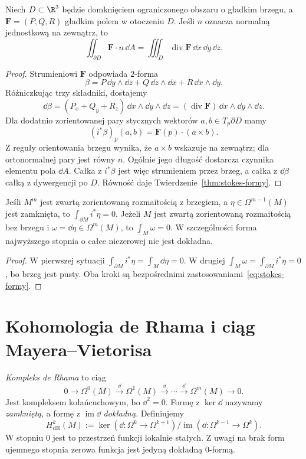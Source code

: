 \begin{wniosek}
\label{cor:stokes-gauss}
Niech $D\subset\R^3$ będzie domknięciem ograniczonego
obszaru o gładkim brzegu, a $\mathbf F=(P,Q,R)$
gładkim polem w otoczeniu $D$.
Jeśli $n$ oznacza normalną jednostkową
na zewnątrz, to
\[
 \iint_{\partial D}\mathbf F\cdot n\,\dd A
 =\iiint_D\operatorname{div}\mathbf F\,
                  \dd x\,\dd y\,\dd z.
\]
\end{wniosek}
\begin{proof}
Strumieniowi $\mathbf F$ odpowiada $2$-forma
\[
 \beta=P\,\dd y\wedge\dd z
      +Q\,\dd z\wedge\dd x
      +R\,\dd x\wedge\dd y.
\]
Różniczkując trzy składniki, dostajemy
\[
 \dd\beta=(P_x+Q_y+R_z)\,
           \dd x\wedge\dd y\wedge\dd z
          =(\operatorname{div}\mathbf F)\,
           \dd x\wedge\dd y\wedge\dd z.
\]
Dla dodatnio zorientowanej pary stycznych
wektorów $a,b\in T_p\partial D$ mamy
\[
 (i^*\beta)_p(a,b)
 =\mathbf F(p)\cdot(a\times b).
\]
Z reguły orientowania brzegu wynika, że
$a\times b$ wskazuje na zewnątrz; dla
ortonormalnej pary jest równy $n$.
Ogólnie jego długość dostarcza czynnika
elementu pola $\dd A$. Całka z $i^*\beta$
jest więc strumieniem przez brzeg, a całka
z $\dd\beta$ całką z dywergencji po $D$.
Równość daje Twierdzenie~\ref{thm:stokes-formy}.
\end{proof}

\begin{wniosek}
\label{cor:stokes-top-form}
Jeśli $M^m$ jest zwartą zorientowaną rozmaitością
z brzegiem, a $\eta\in\Omega^{m-1}(M)$ jest
zamknięta, to $\int_{\partial M}i^*\eta=0$.
Jeżeli $M$ jest zwartą zorientowaną rozmaitością
bez brzegu i $\omega=\dd\eta\in\Omega^m(M)$,
to $\int_M\omega=0$. W szczególności forma
najwyższego stopnia o całce niezerowej nie jest
dokładna.
\end{wniosek}
\begin{proof}
W pierwszej sytuacji
$\int_{\partial M}i^*\eta=\int_M\dd\eta=0$.
W drugiej
$\int_M\omega=\int_{\partial M}i^*\eta=0$,
bo brzeg jest pusty. Oba kroki są
bezpośrednimi zastosowaniami~\eqref{eq:stokes-formy}.
\end{proof}
\section{Kohomologia de Rhama i ciąg Mayera--Vietorisa}
\label{sec:de-rham-mv}

\begin{definicja}
\label{def:de-rham-cohomology}
\emph{Kompleks de Rhama} to ciąg
\[
 0\longrightarrow\Omega^0(M)\xrightarrow{\dd}
 \Omega^1(M)\xrightarrow{\dd}\cdots
 \xrightarrow{\dd}\Omega^m(M)\longrightarrow0.
\]
Jest kompleksem kołańcuchowym, bo $\dd^2=0$.
Formę z $\ker\dd$ nazywamy \emph{zamkniętą},
a formę z $\operatorname{im}\dd$ \emph{dokładną}. Definiujemy
\[
 H^k_{\mathrm{dR}}(M)
 :=\ker(\dd:\Omega^k\to\Omega^{k+1})/
   \operatorname{im}(\dd:\Omega^{k-1}\to\Omega^k).
\]
W stopniu $0$ jest to przestrzeń funkcji lokalnie stałych.
Z uwagi na brak form ujemnego stopnia zerowa funkcja
jest jedyną dokładną $0$-formą.
\end{definicja}

